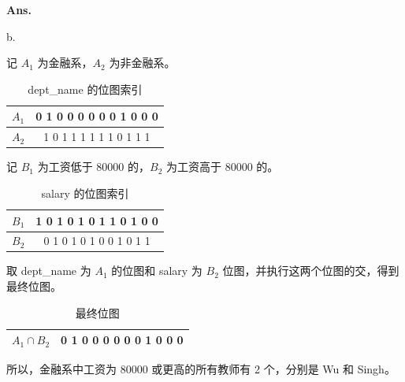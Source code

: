 \documentclass[12pt, a4paper, UTF8, fontset=windows]{ctexbook}
\newenvironment{solution}{\par\noindent\textbf{Ans.}}{\par}
\begin{document}
\begin{solution}
\newpage 

b.

记 $A_1$ 为金融系，$A_2$ 为非金融系。

\begin{table}[h]
    \centering
    \begin{tabular}{|c|c|}
        \hline
        $A_1$ & 0 1 0 0 0 0 0 0 1 0 0 0
        \\ \hline
        $A_2$ & 1 0 1 1 1 1 1 1 0 1 1 1
        \\ \hline
    \end{tabular}

    \caption{dept\_name 的位图索引}
\end{table}

记 $B_1$ 为工资低于 80000 的，$B_2$ 为工资高于 80000 的。

\begin{table}[h]
    \centering
    \begin{tabular}{|c|c|}
        \hline
        $B_1$ & 1 0 1 0 1 0 1 1 0 1 0 0 
        \\ \hline
        $B_2$ & 0 1 0 1 0 1 0 0 1 0 1 1
        \\ \hline
    \end{tabular}

    \caption{salary 的位图索引}
\end{table}

取 dept\_name 为 $A_1$ 的位图和 salary 为 $B_2$ 位图，并执行这两个位图的交，得到最终位图。

\begin{table}[h]
    \centering
    \begin{tabular}{|c|c|}
        \hline
        $A_1 \cap B_2$ & 0 1 0 0 0 0 0 0 1 0 0 0 
        \\ \hline
    \end{tabular}

    \caption{最终位图}
\end{table}

所以，金融系中工资为 80000 或更高的所有教师有 2 个，分别是 Wu 和 Singh。
 
\end{solution}

\newpage 
\end{document}
